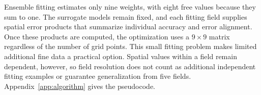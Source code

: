 Ensemble fitting estimates only nine weights, with eight free values because
they sum to one. The surrogate models remain fixed, and each fitting field
supplies spatial error products that summarize individual accuracy and error
alignment. Once these products are computed, the optimization uses a
$9\times9$ matrix regardless of the number of grid points. This small fitting
problem makes limited additional fine data a practical option. Spatial values
within a field remain dependent, however, so field resolution does not count
as additional independent fitting examples or guarantee generalization from
five fields. Appendix~\ref{app:algorithm} gives the pseudocode.
